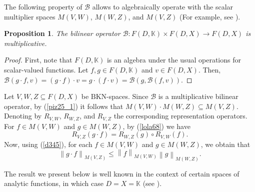 \documentclass[14pt, a4paper]{article}  %
\newcounter{property}
\providecommand{\pare}[1]{\left( #1\right) }
\providecommand{\norm}[1]{\left\lVert#1\right\rVert}
\newcommand{\K}{\mathbb{K}}
\newcommand{\BKn}{\text{BKN}}
\newcommand{\BB}{\mathscr{B}}
\newtheorem{proposition}{Proposition}[section]
\begin{document}
 The following property of $\BB$ allows to algebraically operate with the scalar multiplier spaces $M\pare{V,W}$, $M\pare{W,Z}$, and $M\pare{V,Z}$  (For example, see \cite{B}).

\begin{proposition}
	The bilinear operator $\BB:F\pare{D,\K}\times F\pare{D,X}\to F\pare{D,X}$ is multiplicative.
\end{proposition}
\begin{proof}
	First, note that $F\pare{D,\K}$ is an algebra under the usual operations for scalar-valued functions. Let $f,g\in F\pare{D,\K}$ and $v\in F\pare{D,X}$. Then, $\BB\pare{g\cdot f,v} = \pare{g\cdot f}\cdot v = g\cdot\pare{f\cdot v} = \BB\pare{g,\BB\pare{f,v}}$.
\end{proof}

  Let $V,W,Z\subseteq F\pare{D,X}$ be $\BKn$-spaces. Since $\BB$ is a multiplicative bilinear operator, by (\ref{piz25_1}) it follows that $M\pare{V,W}\cdot M\pare{W,Z}\subseteq M\pare{V,Z}$. Denoting by  $R_{V,W}$, $R_{W,Z}$, and $R_{V,Z}$ the corresponding representation operators. For $f\in M\pare{V,W}$ and $g\in M\pare{W,Z}$, by (\ref{lola68}) we have
\begin{equation}\label{lola69}
R_{V,Z}\pare{g\cdot f} = R_{W,Z}\pare{g}\circ R_{V,W}\pare{f}.
\end{equation}
 Now, using (\ref{d345}), for each $f\in M\pare{V,W}$ and $g\in M\pare{W,Z}$, we obtain that 
\begin{equation}\label{lola32}
\norm{g\cdot f}_{M\pare{V,Z}} \leq \norm{f}_{M\pare{V,W}}\norm{g}_{M\pare{W,Z}}.
\end{equation}

The result we present below is well known in the context of certain spaces of analytic functions, in which case $D=X=\K$ (see \cite[Prop. 7.1]{CMR}).  


 
\end{document}

